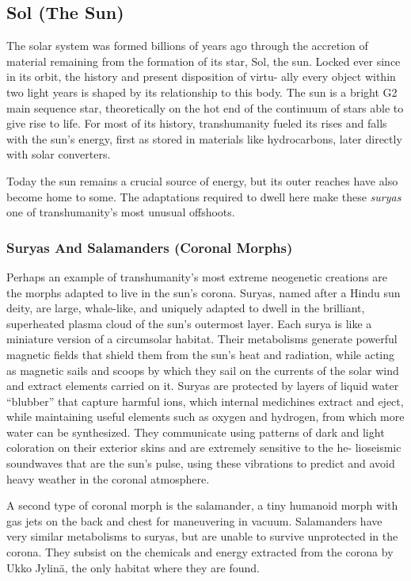 \subsection{Sol (The Sun)}

The solar system was formed billions of years ago 
through the accretion of material remaining from the 
formation of its star, Sol, the sun. Locked ever since in 
its orbit, the history and present disposition of virtu-
ally every object within two light years is shaped by 
its relationship to this body. The sun is a bright G2 
main sequence star, theoretically on the hot end of the 
continuum of stars able to give rise to life. For most 
of its history, transhumanity fueled its rises and falls 
with the sun's energy, first as stored in materials like 
hydrocarbons, later directly with solar converters.

Today the sun remains a crucial source of energy, 
but its outer reaches have also become home to some. 
The adaptations required to dwell here make these 
\textit{suryas} one of transhumanity's most unusual offshoots.

\subsubsection{Suryas And Salamanders (Coronal Morphs)}

Perhaps an example of transhumanity's most extreme 
neogenetic creations are the morphs adapted to live 
in the sun's corona. Suryas, named after a Hindu sun 
deity, are large, whale-like, and uniquely adapted to 
dwell in the brilliant, superheated plasma cloud of the 
sun's outermost layer. Each surya is like a miniature 
version of a circumsolar habitat. Their metabolisms 
generate powerful magnetic fields that shield them 
from the sun's heat and radiation, while acting as 
magnetic sails and scoops by which they sail on the 
currents of the solar wind and extract elements carried 
on it. Suryas are protected by layers of liquid water 
``blubber'' that capture harmful ions, which internal 
medichines extract and eject, while maintaining useful 
elements such as oxygen and hydrogen, from which 
more water can be synthesized. They communicate 
using patterns of dark and light coloration on their 
exterior skins and are extremely sensitive to the he-
lioseismic soundwaves that are the sun's pulse, using 
these vibrations to predict and avoid heavy weather in 
the coronal atmosphere.

A second type of coronal morph is the salamander, 
a tiny humanoid morph with gas jets on the back and 
chest for maneuvering in vacuum. Salamanders have 
very similar metabolisms to suryas, but are unable to 
survive unprotected in the corona. They subsist on the 
chemicals and energy extracted from the corona by 
Ukko Jylinä, the only habitat where they are found.

